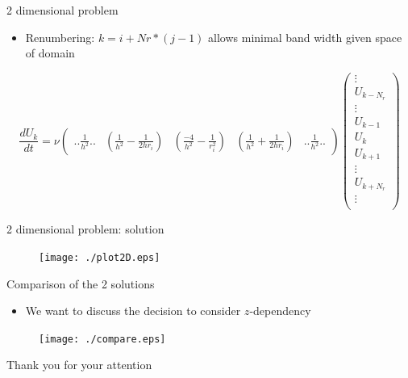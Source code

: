 \documentclass{beamer}
\begin{document}
\begin{frame}{2 dimensional problem}

\begin{itemize}
\item Renumbering: $k = i +Nr*(j-1)$ allows minimal band width given space of domain
\end{itemize}

$$\dfrac{dU_k}{dt}=\nu\begin{pmatrix}
.. \frac{1}{h^2} .. &(\frac{1}{h^2}-\frac{1}{2hr_i})& (\frac{-4}{h^2} - \frac{1}{r_{i}^2})  & (\frac{1}{h^2}+\frac{1}{2hr_i})& .. \frac{1}{h^2} ..
\end{pmatrix}
\begin{pmatrix}
\vdots \\
U_{k-N_r}\\
\vdots \\
U_{k-1}\\
U_{k}\\
U_{k+1}\\
\vdots \\
U_{k+N_r}\\
\vdots \\
\end{pmatrix}$$

\end{frame}

\begin{frame}{2 dimensional problem: solution}
\begin{figure}[!h]
\centering
\texttt{[image: ./plot2D.eps]}
\end{figure}

\end{frame}


\begin{frame}{Comparison of the 2 solutions}
\begin{itemize}
\item We want to discuss the decision to consider $z$-dependency
\end{itemize}

\begin{figure}[!h]
\centering
\texttt{[image: ./compare.eps]}
\end{figure}
\end{frame}

\begin{frame}
\begin{center}
Thank you for your attention
\end{center}
\end{frame}
\end{document}
